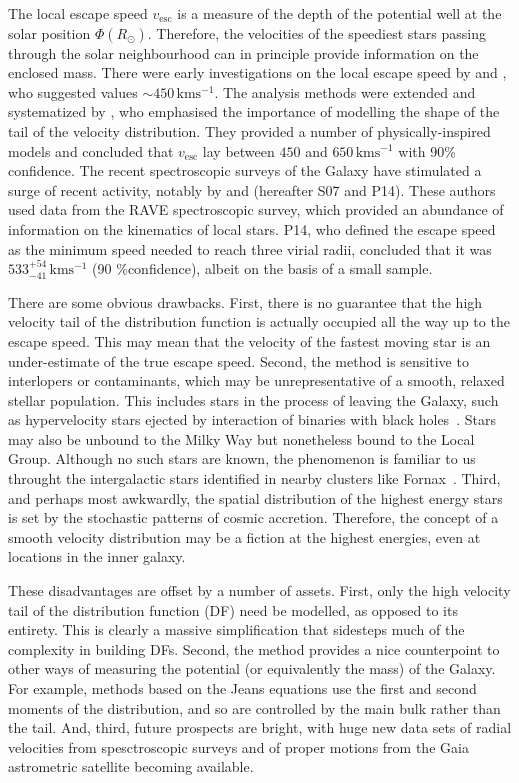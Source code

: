 \documentclass[useAMS,twocolumn,usenatbib]{mn2e}
\def\kms{{\,\mathrm{kms^{-1}}}}
\def\vesc{{v_\mathrm{esc}}}
\begin{document}
The local escape speed $\vesc$ is a measure of the depth of the potential well at the solar position $\Phi(R_\odot)$. 
Therefore, the velocities of the speediest stars passing through the solar neighbourhood can in principle provide information on the enclosed mass. 
There were early investigations on the local escape speed by \citet{Ca81} and \citet{Al82}, who suggested values $\sim 450\kms$.
The analysis methods were extended and systematized by \citet{Le90}, who emphasised the importance of modelling the shape of the tail of the velocity distribution. 
They provided a number of physically-inspired models and concluded that $\vesc$ lay between $450$ and $650 \kms$ with 90\% confidence. 
The recent spectroscopic surveys of the Galaxy have stimulated a surge of recent activity, notably by \cite{Sm07} and \cite{Pi14} (hereafter S07 and P14).
These authors used data from the RAVE spectroscopic survey, which provided an abundance of information on the kinematics of local stars. 
P14, who defined the escape speed as the minimum speed needed to reach three virial radii, concluded that it was $533^{+54}_{-41} \kms$ (90 \%confidence), albeit on the basis of a small sample.

There are some obvious drawbacks. First, there is no guarantee that the high velocity tail of the distribution function is actually occupied all the way up to the escape speed. 
This may mean that the velocity of the fastest moving star is an under-estimate of the true escape speed. 
Second, the method is sensitive to interlopers or contaminants, which may be unrepresentative of a smooth, relaxed stellar population. 
This includes stars in the process of leaving the Galaxy, such as hypervelocity stars ejected by interaction of binaries with black holes~\citep[e.g.,][]{Br15,Bou16}. 
Stars may also be unbound to the Milky Way but nonetheless bound to the Local Group. 
Although no such stars are known, the phenomenon is familiar to us throught the intergalactic stars identified in nearby clusters like Fornax~\citep{Th97}. 
Third, and perhaps most awkwardly, the spatial distribution of the highest energy stars is set by the stochastic patterns of cosmic accretion. 
Therefore, the concept of a smooth velocity distribution may be a fiction at the highest energies, even at locations in the inner galaxy.

These disadvantages are offset by a number of assets. First, only the high velocity tail of the distribution function (DF) need be modelled, as opposed to its entirety. 
This is clearly a massive simplification that sidesteps much of the complexity in building DFs. 
Second, the method provides a nice counterpoint to other ways of measuring the potential (or equivalently the mass) of the Galaxy. 
For example, methods based on the Jeans equations use the first and second moments of the distribution, and so are controlled by the main bulk rather than the tail. 
And, third, future prospects are bright, with huge new data sets of radial velocities from spesctroscopic surveys and of proper motions from the Gaia astrometric satellite becoming available.
\end{document}
